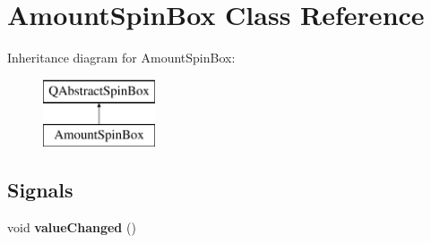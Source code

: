 \hypertarget{class_amount_spin_box}{}\section{Amount\+Spin\+Box Class Reference}
\label{class_amount_spin_box}
Inheritance diagram for Amount\+Spin\+Box\+:\begin{figure}[H]
\begin{center}
\leavevmode
\includegraphics[height=2.000000cm]{class_amount_spin_box}
\end{center}
\end{figure}
\subsection*{Signals}
\begin{DoxyCompactItemize}
\item 
\mbox{\label{class_amount_spin_box_a702534ebb29afb3898ed262404659b7b}} 
void {\bfseries value\+Changed} ()
\end{DoxyCompactItemize}
